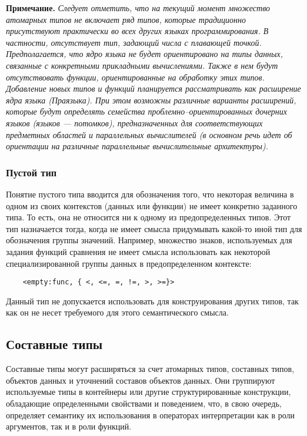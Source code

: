 {\textbf{Примечание.}
\textit{Следует отметить, что на текущий момент множество атомарных типов не включает ряд типов, которые традиционно присутствуют практически во всех других языках программирования. В частности, отсутствует тип, задающий числа с плавающей точкой. Предполагается, что ядро языка не будет ориентировано на типы данных, связанные с конкретными прикладными вычислениями. Также в нем будут отсутствовать функции, ориентированные на обработку этих типов. Добавление новых типов и функций планируется рассматривать как расширение ядра языка (Праязыка). При этом возможны различные варианты расширений, которые будут определять семейства проблемно--ориентированных дочерних языков (языков --- потомков), предназначенных для соответствующих предметных областей и параллельных вычислителей (в основном речь идет об ориентации на различные параллельные вычислительные архитектуры).}

\subsubsection{Пустой тип}

Понятие пустого типа вводится для обозначения того, что некоторая величина в одном из своих контекстов (данных или функции) не имеет конкретно заданного типа. То есть, она не относится ни к одному из предопределенных типов. Этот тип назначается тогда, когда не имеет смысла придумывать какой-то иной тип для обозначения группы значений. Например, множество знаков, используемых для задания функций сравнения не имеет смысла использовать как некоторой специализированной группы данных в предопределенном контексте:

\begin{verbatim}
	<empty:func, { <, <=, =, !=, >, >=}>
\end{verbatim}

Данный тип не допускается использовать для конструирования других типов, так как он не несет требуемого для этого семантического смысла.

\subsection{Составные типы}

Составные типы могут расширяться за счет атомарных типов, составных типов, объектов данных и уточнений составов объектов данных. Они группируют используемые типы в контейнеры или другие структурированные конструкции, обладающие определенными свойствами и поведением, что, в свою очередь, определяет семантику их использования в операторах интерпретации как в роли аргументов, так и в роли функций.

}
